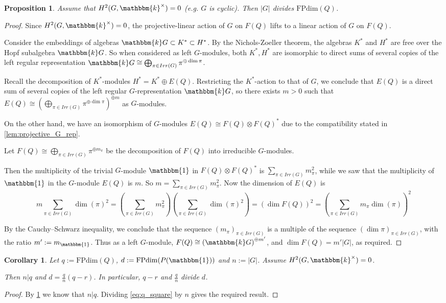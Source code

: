 \documentclass{amsart}
\theoremstyle{plain}%
\newtheorem{prop}[lemma]{Proposition}
\newtheorem{crl}[lemma]{Corollary}
\theoremstyle{remark}
\newcommand{\1}{\mathbbm{1}}
\newcommand{\FPdim}{\mathrm{FPdim}}
\newcommand{\kk}{\mathbbm{k}}
\begin{document}
    \begin{prop}\label{prop: dim(Q) in non-semisimple integral near-group categories}
        Assume that $H^2(G,\kk^\times) = 0$ (e.g. $G$ is cyclic). Then $|G|$ divides $\FPdim(Q)$.
    \end{prop}
    \begin{proof}
    Since $H^2(G,\kk^\times) = 0$, the projective-linear action of $G$ on $F(Q)$ lifts to a linear action of $G$ on $F(Q)$.
    
    Consider the embeddings of algebras $\kk G \subset K^*\subset H^*$. By the Nichols-Zoeller theorem, the algebras $K^*$ and $H^*$ are free over the Hopf subalgebra $\kk G$. So when considered as left $G$-modules, both $K^*, H^*$ are isomorphic to direct sums of several copies of the left regular representation $\kk G\cong \bigoplus_{\pi \in Irr(G)} \pi^{\oplus \dim \pi}$. 
    
    Recall the decomposition of $K^*$-modules $H^*=K^*\oplus E(Q)$. Restricting the $K^*$-action to that of $G$, we conclude that $E(Q)$ is a direct sum of several copies of the left regular $G$-representation $\kk G$, so there exists $m> 0$ such that $E(Q)\cong \left(\bigoplus_{\pi \in Irr(G)} \pi^{\oplus \dim \pi}\right)^{\oplus m}$ as $G$-modules.

    On the other hand, we have an isomorphism of $G$-modules $E(Q)\cong F(Q)\otimes F(Q)^*$ due to the compatibility stated in \cref{lem:projective_G_rep}. 

  Let $F(Q)\cong  \bigoplus_{\pi \in Irr(G)} \pi^{\oplus m_{\pi}}$ be the decomposition of $F(Q)$ into irreducible $G$-modules. 

  Then the multiplicity of the trivial $G$-module $\1$ in $F(Q)\otimes F(Q)^*$ is $\sum_{
  \pi \in Irr(G)} m_{\pi}^2$, while we saw that the multiplicity of $\1$ in the $G$-module $E(Q)$ is $m$. So $m=\sum_{
  \pi \in Irr(G)} m_{\pi}^2$. Now the dimension of $E(Q)$ is $$ m\sum_{  \pi \in Irr(G)} \dim(\pi)^2=  \left(\sum_{  \pi \in Irr(G)} m_\pi^2 \right)\left(\sum_{  \pi \in Irr(G)} \dim(\pi)^2 \right)=(\dim F(Q))^2=\left(\sum_{ \pi \in Irr(G)} m_\pi\dim(\pi)\right)^2$$

  By the Cauchy--Schwarz inequality, we conclude that the sequence $(m_{\pi})_{\pi \in Irr(G)}$ is a multiple of the sequence $(\dim{\pi})_{\pi \in Irr(G)}$, with the ratio $m':=m_{\1}$. Thus as a left $G$-module, $F(Q) \cong \left(\kk G\right)^{\oplus m'}$, and $\dim F(Q)=m'|G|$, as required.
\end{proof}
\begin{crl}\label{corollary: q-r divides d in trivial central extensions}
   Let $q:=\FPdim(Q)$, $d:=\FPdim (P(\1))$ and $n:=|G|$. Assume $H^2(G,\kk^\times) = 0$. 
     
     Then $n|q$ and $d =\frac{q}{n}(q-r)$. In particular, $q-r$ and $\frac{q}{n}$ divide $d$.
\end{crl}
\begin{proof}
    By \cref{prop: dim(Q) in non-semisimple integral near-group categories} we know that $n\rvert q$. Dividing \cref{eq:q_square} by $n$ gives the required result.
\end{proof}
\end{document}
